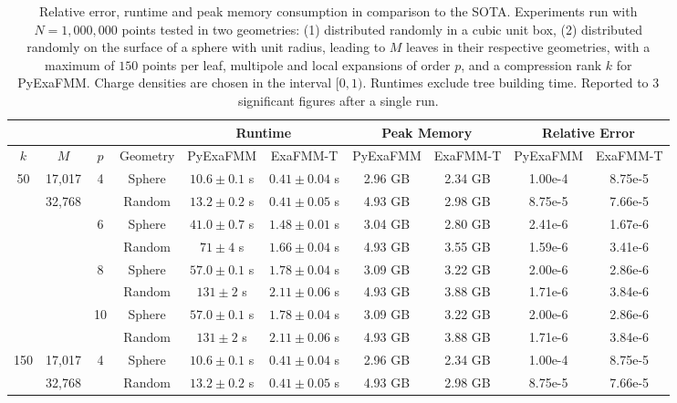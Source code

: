 \documentclass{IEEEcsmag}
\begin{document}
\begin{table}
	\centering
	\caption{Relative error, runtime and peak memory consumption in comparison to the SOTA. Experiments run with $N=1,000,000$ points tested in two geometries: (1) distributed randomly in a cubic unit box, (2) distributed randomly on the surface of a sphere with unit radius, leading to $M$ leaves in their respective geometries, with a maximum of $150$ points per leaf, multipole and local expansions of order $p$, and a compression rank $k$ for PyExaFMM. Charge densities are chosen in the interval $[0, 1)$. Runtimes exclude tree building time. Reported to 3 significant figures after a single run.}
	\begin{tabular}{|*{10}{c|}}
		\hline
		& & &   & \multicolumn{2}{c|}{Runtime} & \multicolumn{2}{c|}{Peak Memory} & \multicolumn{2}{c|}{Relative Error}\\
		\hline
		$k$ & $M$ &$p$ &  Geometry   &   PyExaFMM  &  ExaFMM-T &    PyExaFMM  &  ExaFMM-T  &   PyExaFMM  &  ExaFMM-T\\
		\hline
		50 & 17,017 & 4   &   Sphere  &  $10.6 \pm 0.1$ s & $0.41 \pm 0.04$ s  &  2.96 GB  &   2.34 GB  & 1.00e-4 & 8.75e-5\\
		 & 32,768 &    &   Random  &  $13.2 \pm 0.2$ s &  $0.41 \pm 0.05$ s &  4.93 GB  &   2.98 GB  & 8.75e-5 & 7.66e-5\\
		 &  & 6   &   Sphere  &  $41.0 \pm 0.7$ s &   $1.48 \pm 0.01$ s  &  3.04 GB  &   2.80 GB  & 2.41e-6 & 1.67e-6\\
		 &  &    &   Random  &  $71 \pm 4$ s &   $1.66 \pm 0.04$ s  &  4.93 GB  &   3.55 GB  & 1.59e-6 & 3.41e-6\\
		 &  & 8   &   Sphere  &  $57.0 \pm 0.1$ s &  $1.78 \pm 0.04$ s  &  3.09 GB  &   3.22 GB  & 2.00e-6 & 2.86e-6\\
		 &  &    &   Random  & $131 \pm 2$ s &   $2.11 \pm 0.06$ s  &  4.93 GB  &   3.88 GB  & 1.71e-6 & 3.84e-6\\
		 &  & 10   &   Sphere  &  $57.0 \pm 0.1$ s &  $1.78 \pm 0.04$ s  &  3.09 GB  &   3.22 GB  & 2.00e-6 & 2.86e-6\\
		 &  &    &   Random  & $131 \pm 2$ s &   $2.11 \pm 0.06$ s  &  4.93 GB  &   3.88 GB  & 1.71e-6 & 3.84e-6\\
		150 & 17,017 & 4   &   Sphere  &  $10.6 \pm 0.1$ s & $0.41 \pm 0.04$ s  &  2.96 GB  &   2.34 GB  & 1.00e-4 & 8.75e-5\\
		 & 32,768 &    &   Random  &  $13.2 \pm 0.2$ s &  $0.41 \pm 0.05$ s &  4.93 GB  &   2.98 GB  & 8.75e-5 & 7.66e-5\\

\end{tabular}
\end{table}
\end{document}
